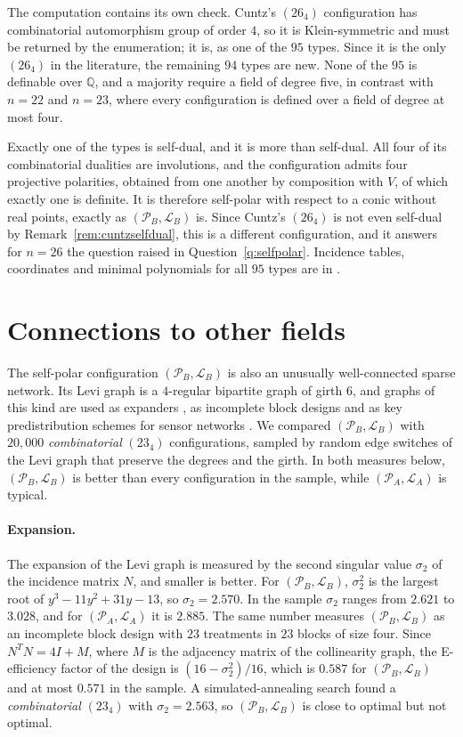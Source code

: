 \documentclass[11pt]{article}
\theoremstyle{plain}
\theoremstyle{definition}
\newcommand{\QQ}{\mathbb{Q}}
\newcommand{\cP}{\mathcal{P}}
\newcommand{\cL}{\mathcal{L}}
\begin{document}
The computation contains its own check.  Cuntz's $(26_4)$ configuration \cite{Cun18} has combinatorial automorphism group of order $4$, so it is Klein-symmetric and must be returned by the enumeration; it is, as one of the $95$ types.  Since it is the only $(26_4)$ in the literature, the remaining $94$ types are new.  None of the $95$ is definable over $\QQ$, and a majority require a field of degree five, in contrast with $n=22$ and $n=23$, where every configuration is defined over a field of degree at most four.

Exactly one of the types is self-dual, and it is more than self-dual.  All four of its combinatorial dualities are involutions, and the configuration admits four projective polarities, obtained from one another by composition with $V$, of which exactly one is definite.  It is therefore self-polar with respect to a conic without real points, exactly as $(\cP_B,\cL_B)$ is.  Since Cuntz's $(26_4)$ is not even self-dual by Remark~\ref{rem:cuntzselfdual}, this is a different configuration, and it answers for $n=26$ the question raised in Question~\ref{q:selfpolar}.  Incidence tables, coordinates and minimal polynomials for all $95$ types are in \cite{Lu26}.

\section{Connections to other fields}\label{sec:connections}

The self-polar configuration $(\cP_B,\cL_B)$ is also an unusually well-connected sparse network.  Its Levi graph is a $4$-regular bipartite graph of girth $6$, and graphs of this kind are used as expanders \cite{HLW06}, as incomplete block designs \cite{JW95} and as key predistribution schemes for sensor networks \cite{CY07}.  We compared $(\cP_B,\cL_B)$ with $20{,}000$ \emph{combinatorial} $(23_4)$ configurations, sampled by random edge switches of the Levi graph that preserve the degrees and the girth.  In both measures below, $(\cP_B,\cL_B)$ is better than every configuration in the sample, while $(\cP_A,\cL_A)$ is typical.

\paragraph{Expansion.}  The expansion of the Levi graph is measured by the second singular value $\sigma_2$ of the incidence matrix $N$, and smaller is better.  For $(\cP_B,\cL_B)$, $\sigma_2^2$ is the largest root of $y^3-11y^2+31y-13$, so $\sigma_2=2.570$.  In the sample $\sigma_2$ ranges from $2.621$ to $3.028$, and for $(\cP_A,\cL_A)$ it is $2.885$.  The same number measures $(\cP_B,\cL_B)$ as an incomplete block design with $23$ treatments in $23$ blocks of size four.  Since $N^{T}N=4I+M$, where $M$ is the adjacency matrix of the collinearity graph, the E-efficiency factor of the design is $(16-\sigma_2^2)/16$, which is $0.587$ for $(\cP_B,\cL_B)$ and at most $0.571$ in the sample.  A simulated-annealing search found a \emph{combinatorial} $(23_4)$ with $\sigma_2=2.563$, so $(\cP_B,\cL_B)$ is close to optimal but not optimal.
\end{document}
